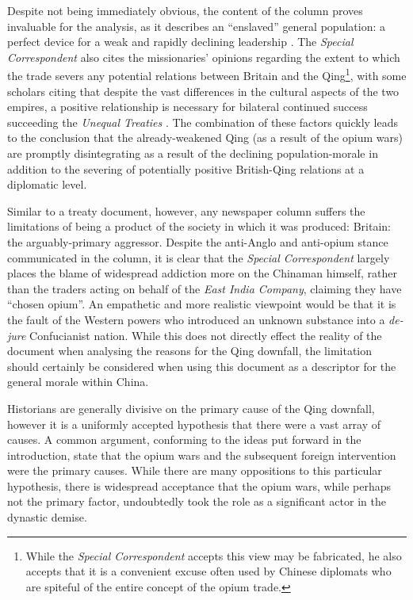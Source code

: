 \documentclass[a4paper,oneside]{article}
\begin{document}
Despite not being immediately obvious, the content of the column proves
invaluable for the analysis, as it describes an ``enslaved'' general population:
a perfect device for a weak and rapidly declining leadership
\autocite{Rotberg:2003}. The \textit{Special Correspondent} also cites the
missionaries' opinions regarding the extent to which the trade severs any
potential relations between Britain and the Qing\footnote{While the
\textit{Special Correspondent} accepts this view may be fabricated, he also
accepts that it is a convenient excuse often used by Chinese diplomats who are
spiteful of the entire concept of the opium trade.}, with some scholars citing
that despite the vast differences in the cultural aspects of the two empires, a
positive relationship is necessary for bilateral continued success succeeding
the \textit{Unequal Treaties} \autocite{Fairbank:1942}. The combination of these
factors quickly leads to the conclusion that the already-weakened Qing (as a
result of the opium wars) are promptly disintegrating as a result of the
declining population-morale in addition to the severing of potentially positive
British-Qing relations at a diplomatic level.

Similar to a treaty document, however, any newspaper column suffers the
limitations of being a product of the society in which it was produced: Britain:
the arguably-primary aggressor. Despite the anti-Anglo and anti-opium stance
communicated in the column, it is clear that the \textit{Special Correspondent}
largely places the blame of widespread addiction more on the Chinaman himself,
rather than the traders acting on behalf of the \textit{East India Company},
claiming they have ``chosen opium''. An empathetic and more realistic viewpoint
would be that it is the fault of the Western powers who introduced an unknown
substance into a \textit{de-jure} Confucianist \autocite{Billioud:2007} nation.
While this does not directly effect the reality of the document when analysing
the reasons for the Qing downfall, the limitation should certainly be considered
when using this document as a descriptor for the general morale within China.

Historians are generally divisive on the primary cause of the Qing downfall,
however it is a uniformly accepted hypothesis that there were a vast array of
causes. A common argument, conforming to the ideas put forward in the
introduction, state that the opium wars and the subsequent foreign intervention
were the primary causes. While there are many oppositions to this particular
hypothesis, there is widespread acceptance that the opium wars, while perhaps
not the primary factor, undoubtedly took the role as a significant actor in the
dynastic demise.
\end{document}
